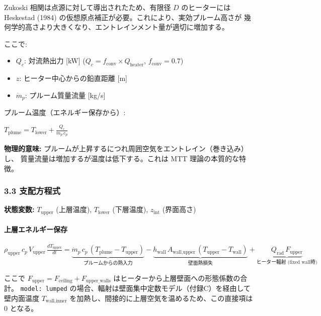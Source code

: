 \documentclass[a4paper,11pt]{article}
\begin{document}
Zukoski 相関は点源に対して導出されたため、有限径 $D$ のヒーターには
Heskestad (1984) の仮想原点補正が必要。これにより、実効プルーム高さが
幾何学的高さより大きくなり、エントレインメント量が適切に増加する。

ここで:

\begin{itemize} \item $Q_c$: 対流熱出力 [kW] ($Q_c = f_{\text{conv}} \times Q_{\text{heater}}$, $f_{\text{conv}} = 0.7$) \end{itemize}
\begin{itemize} \item $z$: ヒーター中心からの鉛直距離 [m] \end{itemize}
\begin{itemize} \item $\dot{m}_p$: プルーム質量流量 [kg/s] \end{itemize}

プルーム温度（エネルギー保存から）:

$
T_{\text{plume}} = T_{\text{lower}} + \frac{Q_c}{\dot{m}_p \, c_p}
$

\textbf{物理的意味:} プルームが上昇するにつれ周囲空気をエントレイン（巻き込み）し、
質量流量は増加するが温度は低下する。これは MTT 理論の本質的な特徴。

\subsubsection{3.3 支配方程式}

\textbf{状態変数:} $T_{\text{upper}}$ (上層温度), $T_{\text{lower}}$ (下層温度), $z_{\text{int}}$ (界面高さ)

\paragraph{上層エネルギー保存}

$
\rho_{\text{upper}} \, c_p \, V_{\text{upper}} \, \frac{dT_{\text{upper}}}{dt}
= \underbrace{\dot{m}_p \, c_p \, (T_{\text{plume}} - T_{\text{upper}})}_{\text{プルームからの熱入力}}
- \underbrace{h_{\text{wall}} \, A_{\text{wall,upper}} \, (T_{\text{upper}} - T_{\text{wall}})}_{\text{壁面熱損失}}
+ \underbrace{Q_{\text{rad}} \, F_{\text{upper}}}_{\text{ヒーター輻射 (fixed wall時)}}
$

ここで $F_{\text{upper}} = F_{\text{ceiling}} + F_{\text{upper\_walls}}$ はヒーターから上層壁面への形態係数の合計。
\texttt{model: lumped} の場合、輻射は壁面集中定数モデル（付録C）を経由して
壁内面温度 $T_{\text{wall,inner}}$ を加熱し、間接的に上層空気を温めるため、この直接項は 0 となる。
\end{document}
